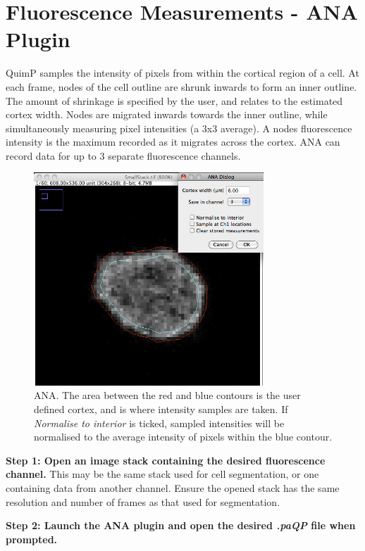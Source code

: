 \documentclass[a4paper,12pt]{article}
\begin{document}
\section{Fluorescence Measurements - ANA Plugin}
\label{ana}

QuimP samples the intensity of pixels from within the cortical region of a cell.  At each frame, nodes of the cell outline
are shrunk inwards to form an inner outline.  The amount of shrinkage is specified by the user, and relates to the
estimated cortex width.  Nodes are 
migrated inwards towards the inner outline, while simultaneously measuring pixel intensities  (a 3x3 average).  
A nodes fluorescence intensity is the maximum recorded as it migrates across the cortex.  ANA can record data for up to 3 separate 
fluorescence channels.

\begin{figure}[ht]
   \centering
   \includegraphics[height=8cm]{ana.png} %
   \caption{ANA.  The area between the red and blue contours is the user defined cortex, and is where
   intensity samples are taken. If \emph{Normalise to interior} is ticked, sampled intensities will be normalised
   to the average intensity of pixels within the blue contour.}
   \label{fig:ana}
\end{figure}

\textbf{Step 1: Open an image stack containing the desired fluorescence channel.}  This may be the same stack used 
for cell segmentation, or one containing data from another channel.  Ensure the opened stack has the 
same resolution and number of frames as that used for segmentation.

\textbf{Step 2: Launch the ANA plugin and open the desired \textit{.paQP} file when prompted.}
\end{document}
